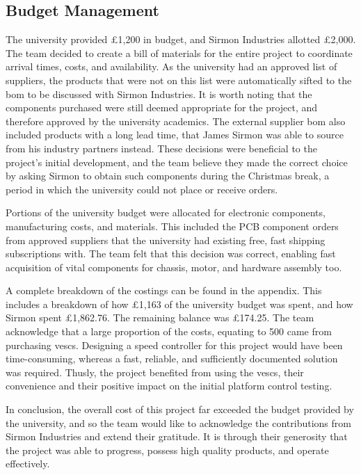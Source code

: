 \documentclass [12pt]{article}
\begin{document}
\subsection{Budget Management}

The university provided £1,200 in budget, and Sirmon Industries allotted £2,000. The team decided to create a bill of materials for the entire project to coordinate arrival times, costs, and availability. As the university had an approved list of suppliers, the products that were not on this list were automatically sifted to the \gls{bom} to be discussed with Sirmon Industries. It is worth noting that the components purchased were still deemed appropriate for the project, and therefore approved by the university academics. The external supplier \gls{bom} also included products with a long lead time, that James Sirmon was able to source from his industry partners instead. These decisions were beneficial to the project’s initial development, and the team believe they made the correct choice by asking Sirmon to obtain such components during the Christmas break, a period in which the university could not place or receive orders.

Portions of the university budget were allocated for electronic components, manufacturing costs, and materials. This included the PCB component orders from approved suppliers that the university had existing free, fast shipping subscriptions with. The team felt that this decision was correct, enabling fast acquisition of vital components for chassis, motor, and hardware assembly too.

A complete breakdown of the costings can be found in the appendix. This includes a breakdown of how £1,163 of the university budget was spent, and how Sirmon spent £1,862.76. The remaining balance was £174.25. The team acknowledge that a large proportion of the costs, equating to 500 came from purchasing \gls{vesc}s. Designing a speed controller for this project would have been time-consuming, whereas a fast, reliable, and sufficiently documented solution was required. Thusly, the project benefited from using the \gls{vesc}s, their convenience and their positive impact on the initial platform control testing.

In conclusion, the overall cost of this project far exceeded the budget provided by the university, and so the team would like to acknowledge the contributions from Sirmon Industries and extend their gratitude. It is through their generosity that the project was able to progress, possess high quality products, and operate effectively.
\end{document}
